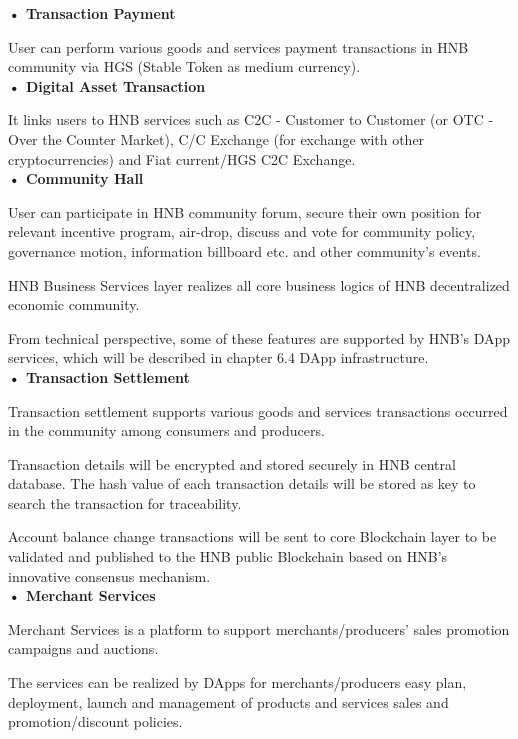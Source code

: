 \documentclass[fleqn,10pt]{SelfArx} %
\begin{document}
\textbf {•	Transaction Payment}

User can perform various goods and services payment transactions in HNB community via HGS (Stable Token as medium currency). \\

\textbf {•	Digital Asset Transaction}

It links users to HNB services such as C2C - Customer to Customer (or OTC - Over the Counter Market), C/C Exchange (for exchange with other cryptocurrencies) and Fiat current/HGS C2C Exchange. \\

\textbf {•	Community Hall}

User can participate in HNB community forum, secure their own position for relevant incentive program, air-drop, discuss and vote for community policy, governance motion, information billboard etc. and other community’s events. \\ 


HNB Business Services layer realizes all core business logics of HNB decentralized economic community.

From technical perspective, some of these features are supported by HNB’s DApp services, which will be described in chapter 6.4 DApp infrastructure. \\

\textbf {•	Transaction Settlement}

Transaction settlement supports various goods and services transactions occurred in the community among consumers and producers. 

Transaction details will be encrypted and stored securely in HNB central database. The hash value of each transaction details will be stored as key to search the transaction for traceability.

Account balance change transactions will be sent to core Blockchain layer to be validated and published to the HNB public Blockchain based on HNB’s innovative consensus mechanism. \\

\textbf {•	Merchant Services}

Merchant Services is a platform to support merchants/producers’ sales promotion campaigns and auctions.

The services can be realized by DApps for merchants/producers easy plan, deployment, launch and management of products and services sales and promotion/discount policies. 
\end{document}
